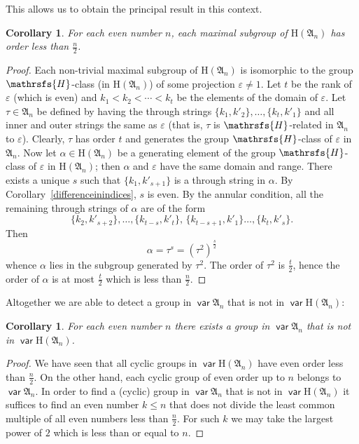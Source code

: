 \documentclass[11pt,reqno]{amsart}
\DeclareMathOperator{\var}{\mathsf{var}}
\numberwithin{equation}{section}
\newtheorem{Cor}[Thm]{Corollary}
\theoremstyle{remark}
\def\Hc{\mathrsfs{H}}
\def\al{\alpha}
\def\ep{\varepsilon}
\def\H{\mathrm H}
\def\A{\mathfrak{A}}
\begin{document}
This allows us to obtain the principal result in this context.

\begin{Cor} \label{maximalsubgroups}
For each even number $n$, each maximal subgroup of $\H(\A_n)$ has
order less than $\frac{n}2$.
\end{Cor}

\begin{proof}
Each non-trivial maximal subgroup of $\H(\A_n)$ is isomorphic to
the group $\Hc$-class (in $\H(\A_n)$) of some projection $\ep\ne
1$. Let $t$ be the rank of $\ep$ (which is even) and
$k_1<k_2<\cdots<k_t$ be the elements of the domain of $\ep$. Let
$\tau\in \A_n$ be defined by having the through strings
$\{k_1,k'_2\}, \dots,\{k_t,k'_1\}$ and all inner and outer strings
the same as $\ep$ (that is, $\tau$ is $\Hc$-related in $\A_n$ to
$\ep$). Clearly, $\tau$ has order $t$ and generates the group
$\Hc$-class of $\ep$ in $\A_n$. Now let $\al\in \H(\A_n)$ be a
generating element of the group $\Hc$-class of $\ep$ in
$\H(\A_n)$; then $\al$ and $\ep$ have the same domain and range.
There exists a unique $s$ such that $\{k_1,k'_{s+1}\}$ is a
through string in $\al$. By Corollary~\ref{differenceinindices},
$s$ is even. By the annular condition, all the remaining through
strings of $\al$ are of the form
$$\{k_2,k'_{s+2}\},\dots,\{k_{t-s},k'_t\},\,\{k_{t-s+1},k'_1\}\dots,
\{k_t,k'_s\}.$$ Then
$$\al=\tau^s=(\tau^2)^{\frac s 2}$$ whence $\al$ lies in the
subgroup generated by $\tau^2$. The order of $\tau^2$ is $\frac t
2$, hence the order of $\al$ is at most $\frac t2$ which is less
than $\frac n 2$.
\end{proof}

Altogether we are able to detect a group in $\var\A_n$ that is not
in $\var\H(\A_n)$:

\begin{Cor}
\label{differenceofanandhan} For each even number $n$ there exists
a group in $\var\A_n$ that is not in $\var\H(\A_n)$.
\end{Cor}

\begin{proof} We have seen that all cyclic groups in $\var\H(\A_n)$
have even order less than $\frac n2$. On the other hand, each
cyclic group of even order up to $n$ belongs to $\var\A_n$. In
order to find a (cyclic) group in $\var\A_n$ that is not in
$\var\H(\A_n)$ it suffices to find an even number $k\le n$ that
does not divide the least common multiple of all even numbers less
than $\frac n 2$. For such $k$ we may take the largest power of
$2$ which is less than or equal to $n$.
\end{proof}
\end{document}
